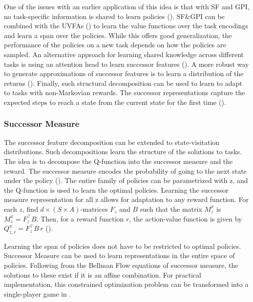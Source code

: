 \documentclass{article}
\begin{document}
One of the issues with an earlier application of this idea is that with SF and GPI, no task-specific information is shared to learn policies (\cite{borsa2018universal}). SF$\&$GPI can be combined with the UVFAs (\cite{schaul2015universal}) to learn the value functions over the task encodings and learn a span over the policies. While this offers good generalization, the performance of the policies on a new task depends on how the policies are sampled. An alternative approach for learning shared knowledge across different tasks is using an attention head to learn successor features (\cite{carvalho2023composing}). A more robust way to generate approximations of successor features is to learn a distribution of the returns (\cite{carvalho2023combining}). Finally, such structural decomposition can be used to learn to adapt to tasks with non-Markovian rewards. The successor representations capture the expected steps to reach a state from the current state for the first time (\cite{moskovitz2021first}). 


\subsubsection{Successor Measure}
The successor feature decomposition can be extended to state-visitation distributions. Such decompositions learn the structure of the solutions to tasks. The idea is to decompose the Q-function into the successor measure and the reward. The successor measure encodes the probability of going to the next state under the policy (\cite{touati2021learning}). The entire family of policies can be parametrized with z, and the Q-function is used to learn the optimal policies. Learning the successor measure representation for all z allows for adaptation to any reward function. For each $z$, find $d \times (S \times A)$-matrices $F_z$ and $B$ such that the matrix $M^{\pi}_z$ is $M^{\pi}_z = F_z^{\top} B$. Then, for a reward function $r$, the action-value function is given by $Q^{\pi}_{z,r} = F_z^{\top} B\,r$ (\cite{touati2021learning}).

Learning the span of policies does not have to be restricted to optimal policies. Successor Measure can be used to learn representations in the entire space of policies. Following from the Bellman Flow equations of successor measure, the solutions to these exist if it is an affine combination. For practical implementation, this constrained optimization problem can be transformed into a single-player game in \cite{agarwal2024proto}.
\end{document}
